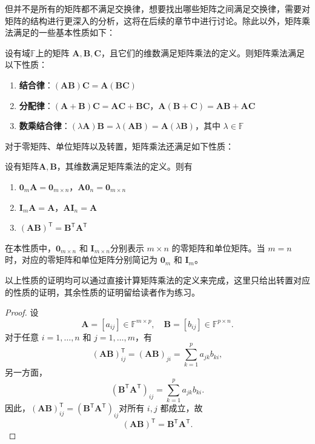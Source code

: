 但并不是所有的矩阵都不满足交换律，想要找出哪些矩阵之间满足交换律，需要对矩阵的结构进行更深入的分析，这将在后续的章节中进行讨论。除此以外，矩阵乘法满足的一些基本性质如下：
\begin{property}
    \label{thm_matrix_mult_basic_properties}
    设有域\( \mathbb{F} \)上的矩阵 \(\mathbf{A}, \mathbf{B}, \mathbf{C}\)，且它们的维数满足矩阵乘法的定义。则矩阵乘法满足以下性质：
    \begin{enumerate}
        \item \textbf{结合律}：\((\mathbf{A}\mathbf{B})\mathbf{C}=\mathbf{A}(\mathbf{B}\mathbf{C})\)
        \item \textbf{分配律}：\((\mathbf{A}+\mathbf{B})\mathbf{C}=\mathbf{A}\mathbf{C}+\mathbf{B}\mathbf{C}\)，\(\mathbf{A}(\mathbf{B}+\mathbf{C})=\mathbf{A}\mathbf{B}+\mathbf{A}\mathbf{C}\)
        \item \textbf{数乘结合律}：\((\lambda\mathbf A)\mathbf B=\lambda(\mathbf A\mathbf B)=\mathbf A(\lambda\mathbf B)\)，其中 \(\lambda\in\mathbb F\)
    \end{enumerate}
\end{property}
对于零矩阵、单位矩阵以及转置，矩阵乘法还满足如下性质：
\begin{property}
    \label{thm_zero_identity_matrix_properties}
    设有矩阵\(\mathbf{A}, \mathbf{B}\)，其维数满足矩阵乘法的定义。则有
    \begin{enumerate}
        \item \(\mathbf{0}_{m}\mathbf{A}=\mathbf{0}_{m \times n}\)，\(\mathbf{A}\mathbf{0}_n=\mathbf{0}_{m \times n}\)
        \item \(\mathbf{I}_m\mathbf{A}=\mathbf{A}\)，\(\mathbf{A}\mathbf{I}_n=\mathbf{A}\)
        \item \((\mathbf{A}\mathbf{B})^{\mathsf T}=\mathbf{B}^{\mathsf T}\mathbf{A}^{\mathsf T}\)
    \end{enumerate}
    在本性质中，\( \bm{0}_{m \times n} \) 和 \( \mathbf{I}_{m \times n} \)分别表示 \( m \times n \) 的零矩阵和单位矩阵。当 \( m = n \) 时，对应的零矩阵和单位矩阵分别简记为 \( \bm{0}_m \) 和 \( \mathbf{I}_m \)。
\end{property}
以上性质的证明均可以通过直接计算矩阵乘法的定义来完成，这里只给出转置对应的性质的证明，其余性质的证明留给读者作为练习。
\begin{proof}
    设
    \[
        \mathbf A=[a_{ij}]\in\mathbb F^{m\times p},
        \quad
        \mathbf B=[b_{ij}]\in\mathbb F^{p\times n}.
    \]
    对于任意 \(i=1,\ldots,n\) 和 \(j=1,\ldots,m\)，有
    \[
        (\mathbf A\mathbf B)^{\mathsf T}_{ij} =(\mathbf A\mathbf B)_{ji} =\sum_{k=1}^{p}a_{jk}b_{ki},
    \]
    另一方面，
    \[
        (\mathbf B^{\mathsf T}\mathbf A^{\mathsf T})_{ij} =\sum_{k=1}^{p}a_{jk}b_{ki}.
    \]
    因此，\( (\mathbf A\mathbf B)^{\mathsf T}_{ij} = (\mathbf B^{\mathsf T}\mathbf A^{\mathsf T})_{ij} \)对所有 \(i,j\) 都成立，故
    \[
        (\mathbf A\mathbf B)^{\mathsf T} = \mathbf B^{\mathsf T}\mathbf A^{\mathsf T}.
    \]
\end{proof}

